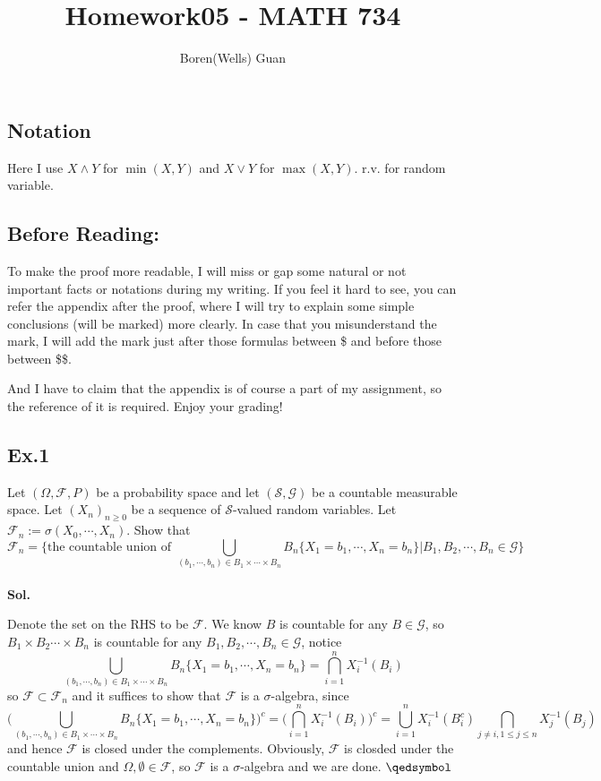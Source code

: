 \documentclass[lang=en,11pt,a4paper,citestyle =authoryear]{elegantpaper}
\title{Homework05 - MATH 734}
\author{Boren(Wells) Guan}
\newcommand{\prvd}{$\hfill \qedsymbol$}
\newcommand{\F}{\mathcal{F}}
\begin{document}
\maketitle

\subsection*{Notation}
Here I use $X \wedge Y$ for $\min(X,Y)$ and $X\vee Y$ for $\max(X,Y)$. r.v. for random variable.

\subsection*{Before Reading:}\par
To make the proof more readable, I will miss or gap some natural or not important facts or notations during my writing. If you feel it hard to see, you can refer the appendix after the proof, where I will try to explain some simple conclusions (will be marked) more clearly. In case that you misunderstand the mark, I will add the mark just after those formulas between \$ and before those between \$\$.\par
And I have to claim that the appendix is of course a part of my assignment, so the reference of it is required. Enjoy your grading!

\subsection*{Ex.1} 
Let $(\Omega,\F,P)$ be a probability space and let $(\mathscr{S}, \mathscr{G})$ be a countable measurable space. Let $(X_n)_{n\geq 0}$ be a sequence of $\mathscr{S}$-valued random variables. Let $\F_n:=\sigma(X_0,\cdots,X_n)$. Show that
\[\F_n = \{\text{the countable union of }\bigcup_{(b_1,\cdots,b_n) \in B_1\times\cdots\times B_n} B_n \{X_1 = b_1,\cdots,X_n = b_n\}|B_1,B_2,\cdots,B_n \in \mathscr{G}\}\]
\vspace{0.5em}\\
\textbf{Sol.} \par
    Denote the set on the RHS to be $\F$. We know $B$ is countable for any $B\in\mathscr{G}$, so $B_1\times B_2\cdots \times B_n$ is countable for any $B_1,B_2,\cdots,B_n \in \mathscr{G}$, notice
    \[
    \bigcup_{(b_1,\cdots,b_n) \in B_1\times\cdots\times B_n} B_n \{X_1 = b_1,\cdots,X_n = b_n\} = \bigcap_{i=1}^n X_i^{-1}(B_i)
    \]
    so $\F \subset \F_n$ and it suffices to show that $\F$ is a $\sigma$-algebra, since
    \[
    \Big(\bigcup_{(b_1,\cdots,b_n) \in B_1\times\cdots\times B_n} B_n \{X_1 = b_1,\cdots,X_n = b_n\}\Big)^c = \Big(\bigcap_{i=1}^n X_i^{-1}(B_i)\Big)^c = \bigcup_{i=1}^n X_i^{-1}(B_i^c)\bigcap_{j\neq i, 1\leq j\leq n}X_j^{-1}(B_j)
    \]
    and hence $\F$ is closed under the complements. Obviously, $\F$ is closded under the countable union and $\Omega,\emptyset\in \F$, so $\F$ is a $\sigma$-algebra and we are done.
\prvd
\vspace{0.5em}
\end{document}
